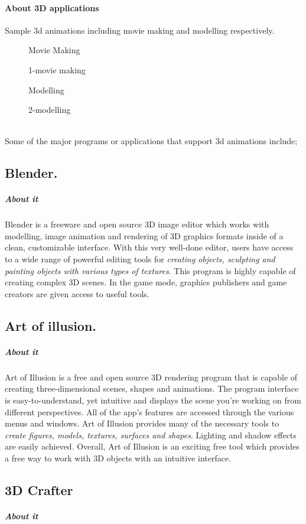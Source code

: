 \documentclass[12pt,a4paper]{article}
\begin{document}
\paragraph*{About 3D applications}
Sample 3d animations including movie making and modelling respectively.
\begin{figure}
Movie Making
\caption{1-movie making}
\end{figure}
\begin{figure}
Modelling
\caption{2-modelling}
\end{figure}
\\
Some of the major programs or applications that support 3d animations include;
\\
\begin{flushleft}
\subsection{Blender.}
\subparagraph*{About it}
\end{flushleft}
Blender is a freeware and open source 3D image editor which works with modelling, image animation and rendering of 3D graphics formats inside of a clean, customizable interface. With this very well-done editor, users have access to a wide range of powerful editing tools for \textit{creating objects, sculpting and painting objects with various types of textures}. This program is highly capable of creating complex 3D scenes. In the game mode, graphics publishers and game creators are given access to useful tools.
\begin{flushleft}
\subsection{Art of illusion.}
\subparagraph*{About it}
\end{flushleft}
Art of Illusion is a free and open source 3D rendering program that is capable of creating three-dimensional scenes, shapes and animations. The program interface is easy-to-understand, yet intuitive and displays the scene you're working on from different perspectives. All of the app's features are accessed through the various menus and windows. Art of Illusion provides many of the necessary tools to\textit{ create figures, models, textures, surfaces and shapes}. Lighting and shadow effects are easily achieved. Overall, Art of Illusion is an exciting free tool which provides a free way to work with 3D objects with an intuitive interface.
\begin{flushleft}
\subsection{3D Crafter}
\subparagraph*{About it}
\end{flushleft}
\end{document}
